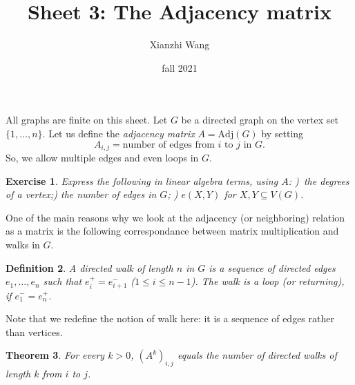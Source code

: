 \documentclass[12pt]{article}
\newtheorem{theorem}{Theorem}
\newtheorem{definition}[theorem]{Definition}
\newtheorem{exercise}[theorem]{Exercise}
\begin{document}
\title{Sheet 3: The Adjacency matrix}
\author{Xianzhi Wang}
\date{fall 2021}
\maketitle

All graphs are finite on this sheet. Let $G$ be a directed graph on the
vertex set $\{1,\ldots,n\}$. Let us define the \emph{adjacency matrix} $A=%
\mathrm{Adj}(G)$ by setting 
\begin{equation*}
A_{i,j}=\text{number of edges from }i\text{ to }j\text{ in }G\text{.}
\end{equation*}
So, we allow multiple edges and even loops in $G$.

\begin{exercise}
Express the following in linear algebra terms, using $A$: )\ the degrees of a vertex;) the number of edges in $G$; ) $e(X,Y)$ for $X,Y\subseteq V(G)$.
\end{exercise}

One of the main reasons why we look at the adjacency (or neighboring)
relation as a matrix is the following correspondance between matrix
multiplication and walks in $G$.

\begin{definition}
A \emph{directed walk of length }$n$ in $G$ is a sequence of directed edges $%
e_{1},\ldots,e_{n}$ such that $e_{i}^{+}=e_{i+1}^{-}$ ($1\leq i\leq n-1$).
The walk is a \emph{loop (or returning)}, if $e_{1}^{-}=e_{n}^{+}$.
\end{definition}

Note that we redefine the notion of walk here: it is a sequence of edges
rather than vertices.

\begin{theorem}
For every $k>0$, $(A^{k})_{i,j}$ equals the number of directed walks of
length $k$ from $i$ to $j$.
\end{theorem}
\end{document}
